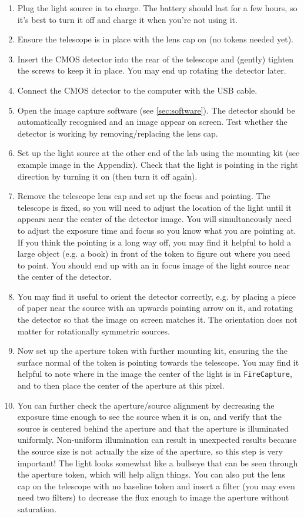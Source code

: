 \documentclass[11pt]{article}
\begin{document}
\begin{enumerate}
    \item Plug the light source in to charge. The battery should last for a few hours, so it's best to turn it off and charge it when you're not using it.
    \item Ensure the telescope is in place with the lens cap on (no tokens needed yet).
    \item Insert the CMOS detector into the rear of the telescope and (gently) tighten the screws to keep it in place. You may end up rotating the detector later.
    \item Connect the CMOS detector to the computer with the USB cable.
    \item Open the image capture software (see \ref{sec:software}). The detector should be automatically recognised and an image appear on screen. Test whether the detector is working by removing/replacing the lens cap.
    \item Set up the light source at the other end of the lab using the mounting kit (see example image in the Appendix). Check that the light is pointing in the right direction by turning it on (then turn it off again).
    \item Remove the telescope lens cap and set up the focus and pointing. The telescope is fixed, so you will need to adjust the location of the light until it appears near the center of the detector image. You will simultaneously need to adjust the exposure time and focus so you know what you are pointing at. If you think the pointing is a long way off, you may find it helpful to hold a large object (e.g. a book) in front of the token to figure out where you need to point. You should end up with an in focus image of the light source near the center of the detector.
    \item You may find it useful to orient the detector correctly, e.g. by placing a piece of paper near the source with an upwards pointing arrow on it, and rotating the detector so that the image on screen matches it. The orientation does not matter for rotationally symmetric sources.
    \item Now set up the aperture token with further mounting kit, ensuring the the surface normal of the token is pointing towards the telescope. You may find it helpful to note where in the image the center of the light is in \texttt{FireCapture}, and to then place the center of the aperture at this pixel.
    \item You can further check the aperture/source alignment by decreasing the exposure time enough to see the source when it is on, and verify that the source is centered behind the aperture and that the aperture is illuminated uniformly. Non-uniform illumination can result in unexpected results because the source size is not actually the size of the aperture, so this step is very important! The light looks somewhat like a bullseye that can be seen through the aperture token, which will help align things. You can also put the lens cap on the telescope with no baseline token and insert a filter (you may even need two filters) to decrease the flux enough to image the aperture without saturation.

\end{enumerate}
\end{document}
